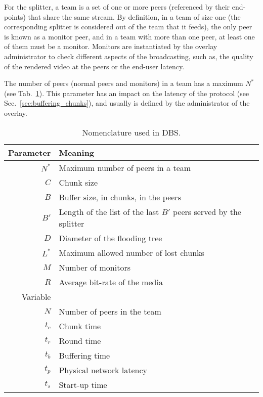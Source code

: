 

\label{sec:team_def}

For the splitter, a team is a set of one or more peers (referenced by
their end-points) that share the same stream. By definition, in a team
of size one (the corresponding splitter is considered out of the team
that it feeds), the only peer is known as a \gls{monitor} peer, and in
a team with more than one peer, at least one of them must be a
monitor. Monitors are instantiated by the overlay administrator to
check different aspects of the broadcasting, such as, the quality of
the rendered video at the peers or the end-user latency.

The number of peers (normal peers and monitors) in a team has a
maximum $N^*$ (see Tab.~\ref{tab:DBS_nomenclature}). This parameter
has an impact on the latency of the protocol (see
Sec.~\ref{sec:buffering_chunks}), and usually is defined by the
administrator of the overlay.

\begin{table}[hbt]
  \centering
  \begin{tabular}{rl}
    Parameter & Meaning \\
    \hline
    $N^*$  & Maximum number of peers in a team \\
    $C$    & Chunk size \\
    $B$    & Buffer size, in chunks, in the peers \\
    $B'$   & Length of the list of the last $B'$ peers served by the splitter \\ 
    $D$    & Diameter of the flooding tree \\
    $L^*$  & Maximum allowed number of lost chunks \\
    $M$    & Number of monitors \\
    $R$    & Average bit-rate of the media \\
    Variable & \\
    \hline
    $N$    & Number of peers in the team \\
    $t_c$  & Chunk time \\
    $t_r$  & Round time \\
    $t_b$  & Buffering time \\
    $t_p$  & Physical network latency \\
    $t_s$  & Start-up time
  \end{tabular}
  \caption{Nomenclature used in DBS.} %
  \label{tab:DBS_nomenclature}
\end{table}

